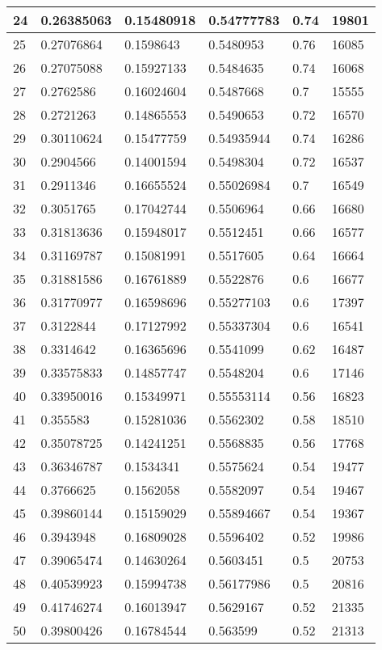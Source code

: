 \begin{longtable}{|l|l|l|l|l|l|}
24 & 0.26385063 & 0.15480918 & 0.54777783 & 0.74 & 19801 \\ \hline 
25 & 0.27076864 & 0.1598643 & 0.5480953 & 0.76 & 16085 \\ \hline 
26 & 0.27075088 & 0.15927133 & 0.5484635 & 0.74 & 16068 \\ \hline 
27 & 0.2762586 & 0.16024604 & 0.5487668 & 0.7 & 15555 \\ \hline 
28 & 0.2721263 & 0.14865553 & 0.5490653 & 0.72 & 16570 \\ \hline 
29 & 0.30110624 & 0.15477759 & 0.54935944 & 0.74 & 16286 \\ \hline 
30 & 0.2904566 & 0.14001594 & 0.5498304 & 0.72 & 16537 \\ \hline 
31 & 0.2911346 & 0.16655524 & 0.55026984 & 0.7 & 16549 \\ \hline 
32 & 0.3051765 & 0.17042744 & 0.5506964 & 0.66 & 16680 \\ \hline 
33 & 0.31813636 & 0.15948017 & 0.5512451 & 0.66 & 16577 \\ \hline 
34 & 0.31169787 & 0.15081991 & 0.5517605 & 0.64 & 16664 \\ \hline 
35 & 0.31881586 & 0.16761889 & 0.5522876 & 0.6 & 16677 \\ \hline 
36 & 0.31770977 & 0.16598696 & 0.55277103 & 0.6 & 17397 \\ \hline 
37 & 0.3122844 & 0.17127992 & 0.55337304 & 0.6 & 16541 \\ \hline 
38 & 0.3314642 & 0.16365696 & 0.5541099 & 0.62 & 16487 \\ \hline 
39 & 0.33575833 & 0.14857747 & 0.5548204 & 0.6 & 17146 \\ \hline 
40 & 0.33950016 & 0.15349971 & 0.55553114 & 0.56 & 16823 \\ \hline 
41 & 0.355583 & 0.15281036 & 0.5562302 & 0.58 & 18510 \\ \hline 
42 & 0.35078725 & 0.14241251 & 0.5568835 & 0.56 & 17768 \\ \hline 
43 & 0.36346787 & 0.1534341 & 0.5575624 & 0.54 & 19477 \\ \hline 
44 & 0.3766625 & 0.1562058 & 0.5582097 & 0.54 & 19467 \\ \hline 
45 & 0.39860144 & 0.15159029 & 0.55894667 & 0.54 & 19367 \\ \hline 
46 & 0.3943948 & 0.16809028 & 0.5596402 & 0.52 & 19986 \\ \hline 
47 & 0.39065474 & 0.14630264 & 0.5603451 & 0.5 & 20753 \\ \hline 
48 & 0.40539923 & 0.15994738 & 0.56177986 & 0.5 & 20816 \\ \hline 
49 & 0.41746274 & 0.16013947 & 0.5629167 & 0.52 & 21335 \\ \hline 
50 & 0.39800426 & 0.16784544 & 0.563599 & 0.52 & 21313 \\ \hline 
\end{longtable}